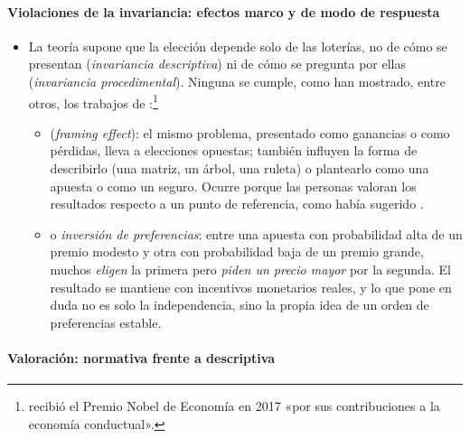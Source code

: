 \documentclass[11pt]{article}
\begin{document}
\paragraph{Violaciones de la invariancia: efectos marco y de modo de respuesta}

\begin{itemize}
\item La teoría supone que la elección depende solo de las loterías, no de cómo se presentan (\emph{invariancia descriptiva}) ni de cómo se pregunta por ellas (\emph{invariancia procedimental}). Ninguna se cumple, como han mostrado, entre otros, los trabajos de :\footnote{ recibió el Premio Nobel de Economía en 2017 «por sus contribuciones a la economía conductual»\nocite{Nobel2017Thaler}.}
  \begin{itemize}
  \item {} (\emph{framing effect}): el mismo problema, presentado como ganancias o como pérdidas, lleva a elecciones opuestas\nocite{TverskyKahneman1981Framing}; también influyen la forma de describirlo (una matriz, un árbol, una ruleta) o plantearlo como una apuesta o como un seguro. Ocurre porque las personas valoran los resultados respecto a un punto de referencia, como había sugerido .
  \item {} o \emph{inversión de preferencias}: entre una apuesta con probabilidad alta de un premio modesto y otra con probabilidad baja de un premio grande, muchos \emph{eligen} la primera pero \emph{piden un precio mayor} por la segunda\nocite{LichtensteinSlovic1971Reversals}. El resultado se mantiene con incentivos monetarios reales\nocite{GretherPlott1979Economic}, y lo que pone en duda no es solo la independencia, sino la propia idea de un orden de preferencias estable.
  \end{itemize}
\end{itemize}

\paragraph{Valoración: normativa frente a descriptiva}
\end{document}
